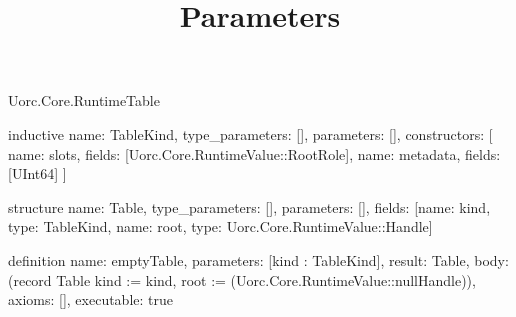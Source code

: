\begin{lexlean}{Uorc.Core.RuntimeTable}
\title{Parameters}
\begin{semanticmodule}
inductive{
  name: TableKind,
  type_parameters: [],
  parameters: [],
  constructors: [
    {name: slots, fields: [Uorc.Core.RuntimeValue::RootRole]},
    {name: metadata, fields: [UInt64]}
  ]
}

structure{
  name: Table,
  type_parameters: [],
  parameters: [],
  fields: [{name: kind, type: TableKind}, {name: root, type: Uorc.Core.RuntimeValue::Handle}]
}

definition{
  name: emptyTable,
  parameters: [kind : TableKind],
  result: Table,
  body: (record Table {kind := kind, root := (Uorc.Core.RuntimeValue::nullHandle)}),
  axioms: [],
  executable: true
}


\end{semanticmodule}
\end{lexlean}
